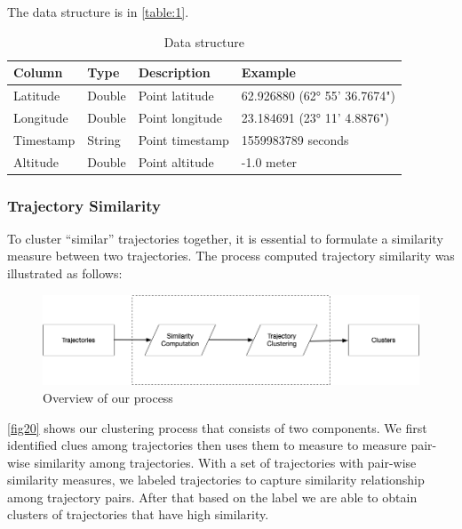 \documentclass[a4paper, 12pt]{article}
\begin{document}
The data structure is in \autoref{table:1}.

\begin{table}[ht!]
    \centering
    \def\arraystretch{3}%
    \begin{tabular}{||l l l l||} 
     \hline
     \textbf{Column} & \textbf{Type} & \textbf{Description} & \textbf{Example} \\ [0.5ex] 
     \hline\hline
     Latitude & Double & Point latitude & 62.926880 (62° 55' 36.7674") \\ 
     Longitude & Double & Point longitude & 23.184691 (23° 11' 4.8876") \\
     Timestamp & String & Point timestamp & 1559983789 seconds \\
     Altitude & Double & Point altitude & -1.0 meter \\ [1ex] 
     \hline
    \end{tabular}
    \caption{Data structure}
    \label{table:1}
\end{table}

\subsubsection{Trajectory Similarity}

To cluster “similar” trajectories together, it is essential to formulate
a similarity measure between two trajectories. The process computed trajectory similarity was illustrated as follows:

\begin{figure}[ht]
    \centering
    \includegraphics[width=1\textwidth]{Process.png}
    \caption{Overview of our process}
    \label{fig20}
\end{figure}

\autoref{fig20} shows our clustering process that consists of two components. We first identified clues among trajectories then uses them to measure to measure pair-wise similarity among trajectories. With a set of trajectories with pair-wise similarity measures, we labeled trajectories to capture similarity relationship among trajectory pairs. After that based on the label we are able to obtain clusters of trajectories that have high similarity.
\end{document}
